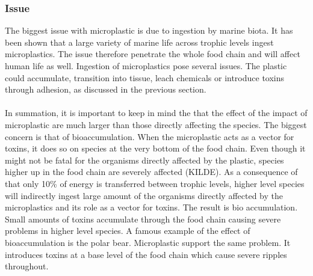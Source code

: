 \subsubsection{Issue}
The biggest issue with microplastic is due to ingestion by marine biota. It has been shown that a large variety of marine life across trophic levels ingest microplastics. The issue therefore penetrate the whole food chain and will affect human life as well. Ingestion of microplastics pose several issues. The plastic could accumulate, transition into tissue, leach chemicals or introduce toxins through adhesion, as discussed in the previous section.
\\
\\
In summation, it is important to keep in mind the that the effect of the impact of microplastic are much larger than those directly affecting the species. The biggest concern is that of bioaccumulation. When the microplastic acts as a vector for toxins, it does so on species at the very bottom of the food chain. Even though it might not be fatal for the organisms directly affected by the plastic, species higher up in the food chain are severely affected (KILDE). As a consequence of that only 10\% of energy is transferred between trophic levels, higher level species will indirectly ingest large amount of the organisms directly affected by the microplastics and its role as a vector for toxins. The result is bio accumulation. Small amounts of toxins accumulate through the food chain causing severe problems in higher level species. A famous example of the effect of bioaccumulation is the polar bear. Microplastic support the same problem. It introduces toxins at a base level of the food chain which cause severe ripples throughout.



